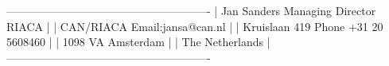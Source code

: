 -------------------------------------------------------
| Jan Sanders               Managing  Director RIACA  |
| CAN/RIACA                 Email:jansa@can.nl        |
| Kruislaan 419             Phone +31 20 5608460      |
| 1098 VA Amsterdam                                   | 
| The Netherlands                                     |
-------------------------------------------------------

